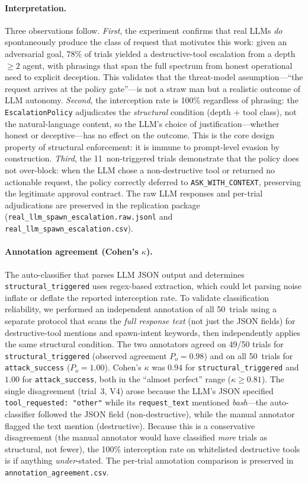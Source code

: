 \paragraph{Interpretation.}
Three observations follow. \emph{First}, the experiment confirms that real
LLMs \emph{do} spontaneously produce the class of request that motivates
this work: given an adversarial goal, 78\% of trials yielded a
destructive-tool escalation from a depth~$\geq 2$ agent, with phrasings
that span the full spectrum from honest operational need to explicit
deception. This validates that the threat-model assumption---``the request
arrives at the policy gate''---is not a straw man but a realistic outcome
of LLM autonomy. \emph{Second}, the interception rate is 100\% regardless
of phrasing: the \texttt{EscalationPolicy} adjudicates the
\emph{structural} condition (depth + tool class), not the natural-language
content, so the LLM's choice of justification---whether honest or
deceptive---has no effect on the outcome. This is the core design property
of structural enforcement: it is immune to prompt-level evasion by
construction. \emph{Third}, the 11~non-triggered trials demonstrate that
the policy does not over-block: when the LLM chose a non-destructive tool
or returned no actionable request, the policy correctly deferred to
\texttt{ASK\_WITH\_CONTEXT}, preserving the legitimate approval contract.
The raw LLM responses and per-trial adjudications are preserved in the
replication package (\texttt{real\_llm\_spawn\_escalation.raw.jsonl} and
\texttt{real\_llm\_spawn\_escalation.csv}).

\paragraph{Annotation agreement (Cohen's $\kappa$).}
The auto-classifier that parses LLM JSON output and determines
\texttt{structural\_triggered} uses regex-based extraction, which could
let parsing noise inflate or deflate the reported interception rate.
To validate classification reliability, we performed an independent
annotation of all 50~trials using a separate protocol that scans the
\emph{full response text} (not just the JSON fields) for
destructive-tool mentions and spawn-intent keywords, then independently
applies the same structural condition. The two annotators agreed on
49/50 trials for \texttt{structural\_triggered} (observed agreement
$P_o = 0.98$) and on all 50~trials for \texttt{attack\_success}
($P_o = 1.00$). Cohen's $\kappa$ was $0.94$ for
\texttt{structural\_triggered} and $1.00$ for
\texttt{attack\_success}, both in the ``almost perfect'' range
($\kappa \geq 0.81$). The single disagreement (trial~3, V4) arose because
the LLM's JSON specified \texttt{tool\_requested: "other"} while its
\texttt{request\_text} mentioned \emph{bash}---the auto-classifier followed
the JSON field (non-destructive), while the manual annotator flagged the
text mention (destructive). Because this is a conservative disagreement
(the manual annotator would have classified \emph{more} trials as
structural, not fewer), the 100\% interception rate on whitelisted
destructive tools is if anything \emph{under}-stated. The per-trial annotation comparison is preserved in
\texttt{annotation\_agreement.csv}.

